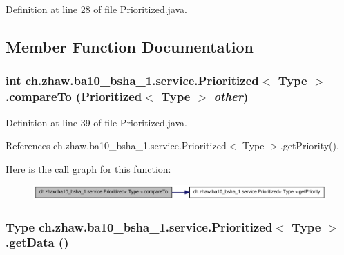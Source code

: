 Definition at line 28 of file Prioritized.java.

\subsection{Member Function Documentation}
\hypertarget{classch_1_1zhaw_1_1ba10__bsha__1_1_1service_1_1Prioritized_3_01Type_01_4_a6ffb80433ea5b02e9bbd4c65c2011659}{
\subsubsection[{compareTo}]{\setlength{\rightskip}{0pt plus 5cm}int ch.zhaw.ba10\_\-bsha\_\-1.service.Prioritized$<$ Type $>$.compareTo (Prioritized$<$ Type $>$ {\em other})}}
\label{classch_1_1zhaw_1_1ba10__bsha__1_1_1service_1_1Prioritized_3_01Type_01_4_a6ffb80433ea5b02e9bbd4c65c2011659}


Definition at line 39 of file Prioritized.java.

References ch.zhaw.ba10\_\-bsha\_\-1.service.Prioritized$<$ Type $>$.getPriority().

Here is the call graph for this function:\nopagebreak
\begin{figure}[H]
\begin{center}
\leavevmode
\includegraphics[width=324pt]{classch_1_1zhaw_1_1ba10__bsha__1_1_1service_1_1Prioritized_3_01Type_01_4_a6ffb80433ea5b02e9bbd4c65c2011659_cgraph}
\end{center}
\end{figure}
\hypertarget{classch_1_1zhaw_1_1ba10__bsha__1_1_1service_1_1Prioritized_3_01Type_01_4_a57010060e23323437b3609b2d4f26466}{
\subsubsection[{getData}]{\setlength{\rightskip}{0pt plus 5cm}Type ch.zhaw.ba10\_\-bsha\_\-1.service.Prioritized$<$ Type $>$.getData ()}}
\label{classch_1_1zhaw_1_1ba10__bsha__1_1_1service_1_1Prioritized_3_01Type_01_4_a57010060e23323437b3609b2d4f26466}


